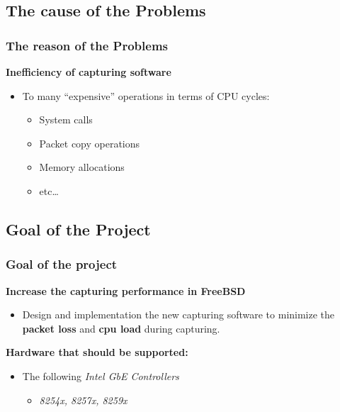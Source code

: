 \documentclass{beamer}
\begin{document}
\subsection*{The cause of the Problems}
\begin{frame}
\frametitle{The reason of the Problems}
\textbf{Inefficiency of  capturing software}\newline
\begin{itemize}
	\item To many ``expensive'' operations in terms of CPU cycles: 
\begin{itemize}
			\item System calls
			\item Packet copy operations
			\item Memory allocations
			\item etc\ldots\newline
\end{itemize}
\end{itemize}
\end{frame}

\subsection*{Goal of the Project}
\begin{frame}
\frametitle{Goal of the project}
\textbf{Increase the capturing performance in FreeBSD}
	\begin{itemize}
		\item Design and implementation the new capturing software to
			minimize the \textbf{packet loss} and \textbf{cpu load} during capturing. \newline \newline
	\end{itemize}
\textbf{Hardware that should be supported:}
\begin{itemize}
	\item The following \emph{Intel GbE Controllers}
		\begin{itemize}
			\item \small{\emph{8254x, 8257x, 8259x}}
		\end{itemize}
\end{itemize}
\end{frame}
\end{document}
